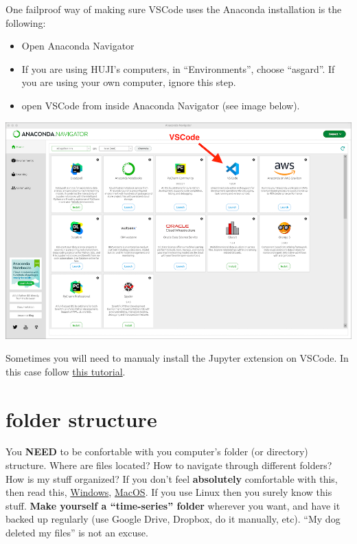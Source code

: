 \documentclass[
  letterpaper,
  DIV=11,
  numbers=noendperiod]{scrreprt}
\providecommand{\tightlist}{%
  \setlength{\itemsep}{0pt}\setlength{\parskip}{0pt}}\usepackage{longtable,booktabs,array}
\begin{document}
One failproof way of making sure VSCode uses the Anaconda installation
is the following:

\begin{itemize}
\tightlist
\item
  Open Anaconda Navigator
\item
  If you are using HUJI's computers, in ``Environments'', choose
  ``asgard''. If you are using your own computer, ignore this step.
\item
  open VSCode from inside Anaconda Navigator (see image below).
\end{itemize}

\includegraphics{basics/anacondanavigator.png}

Sometimes you will need to manualy install the Jupyter extension on
VSCode. In this case follow
\href{https://code.visualstudio.com/docs/datascience/jupyter-notebooks}{this
tutorial}.

\section{folder structure}\label{folder-structure}

You \textbf{NEED} to be confortable with you computer's folder (or
directory) structure. Where are files located? How to navigate through
different folders? How is my stuff organized? If you don't feel
\textbf{absolutely} comfortable with this, then read this,
\href{http://www2.westsussex.gov.uk/LearningandDevelopment/IT\%20Learning\%20Guides/Microsoft\%20Windows\%207/05\%20Working\%20with\%20folders.pdf}{Windows},
\href{https://recoverit.wondershare.com/mac-tips/mac-finder-tutorial-mac.html}{MacOS}.
If you use Linux then you surely know this stuff. \textbf{Make yourself
a ``time-series'' folder} wherever you want, and have it backed up
regularly (use Google Drive, Dropbox, do it manually, etc). ``My dog
deleted my files'' is not an excuse.
\end{document}
